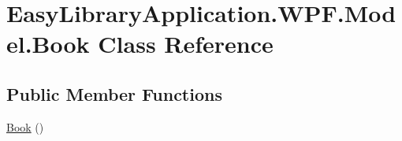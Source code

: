 \hypertarget{class_easy_library_application_1_1_w_p_f_1_1_model_1_1_book}{}\section{Easy\+Library\+Application.\+W\+P\+F.\+Model.\+Book Class Reference}
\label{class_easy_library_application_1_1_w_p_f_1_1_model_1_1_book}
\subsection*{Public Member Functions}
\begin{DoxyCompactItemize}
\item 
\mbox{\hyperlink{class_easy_library_application_1_1_w_p_f_1_1_model_1_1_book_afd8540d25bc43963b2820d4e885dd36e}{Book}} ()
\end{DoxyCompactItemize}
